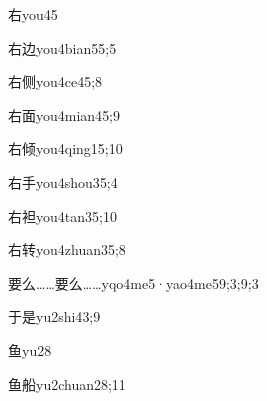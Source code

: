 \begin{verbete}{右}{you4}{5}
\end{verbete}

\begin{verbete}{右边}{you4bian5}{5;5}
\end{verbete}

\begin{verbete}{右侧}{you4ce4}{5;8}
\end{verbete}

\begin{verbete}{右面}{you4mian4}{5;9}
\end{verbete}

\begin{verbete}{右倾}{you4qing1}{5;10}
\end{verbete}

\begin{verbete}{右手}{you4shou3}{5;4}
\end{verbete}

\begin{verbete}{右袒}{you4tan3}{5;10}
\end{verbete}

\begin{verbete}{右转}{you4zhuan3}{5;8}
\end{verbete}

\begin{verbete}{要么……要么……}{yqo4me5·yao4me5}{9;3;9;3}
\end{verbete}

\begin{verbete}{于是}{yu2shi4}{3;9}
\end{verbete}

\begin{verbete}{鱼}{yu2}{8}
\end{verbete}

\begin{verbete}{鱼船}{yu2chuan2}{8;11}
\end{verbete}

